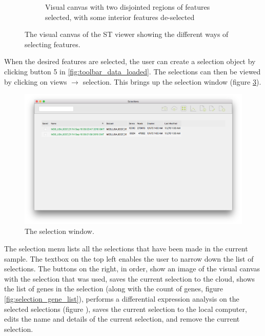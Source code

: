\documentclass[10pt,a4paper,titlepage]{book}
\begin{document}
\begin{figure}[h]
\begin{subfigure}{0.3\linewidth}
		\caption{Visual canvas with two disjointed regions of features selected, with some interior features de-selected}
		\label{fig:selective_selection}
	\end{subfigure}
	\caption[The visual canvas of the ST viewer showing different selection types.]{The visual canvas of the ST viewer showing the different ways of selecting features.}
\end{figure}

When the desired features are selected, the user can create a selection object by clicking button 5 in \ref{fig:toolbar_data_loaded}. The selections can then be viewed by clicking on views $\rightarrow$ selection. This brings up the selection window (figure \ref{fig:selection_menu}).

\begin{figure}[h!]
	\centering
	\includegraphics[width=0.8\linewidth]{./Pictures/selection_menu}
	\caption{The selection window.}
	\label{fig:selection_menu}
\end{figure}

The selection menu lists all the selections that have been made in the current sample. The textbox on the top left enables the user to narrow down the list of selections. The buttons on the right, in order, show an image of the visual canvas with the selection that was used, saves the current selection to the cloud, shows the list of genes in the selection (along with the count of genes, figure \ref{fig:selection_gene_list}), performs a differential expression analysis on the selected selections (figure ), saves the current selection to the local computer, edits the name and details of the current selection, and remove the current selection.
\end{document}

